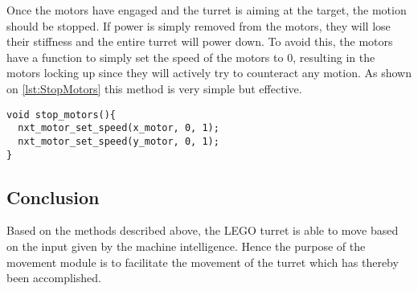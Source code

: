 Once the motors have engaged and the turret is aiming at the target, the motion should be stopped.
If power is simply removed from the motors, they will lose their stiffness and the entire turret will power down.
To avoid this, the motors have a function to simply set the speed of the motors to $0$, resulting in the motors locking up since they will actively try to counteract any motion.
As shown on \autoref{lst:StopMotors} this method is very simple but effective.
\begin{lstlisting}[language=CSharp,label={lst:StopMotors},caption={stop\_motors method from movement.c}]
void stop_motors(){
  nxt_motor_set_speed(x_motor, 0, 1);
  nxt_motor_set_speed(y_motor, 0, 1);
}
\end{lstlisting}

\subsection{Conclusion}
Based on the methods described above, the LEGO turret is able to move based on the input given by the machine intelligence.
Hence the purpose of the movement module is to facilitate the movement of the turret which has thereby been accomplished.
